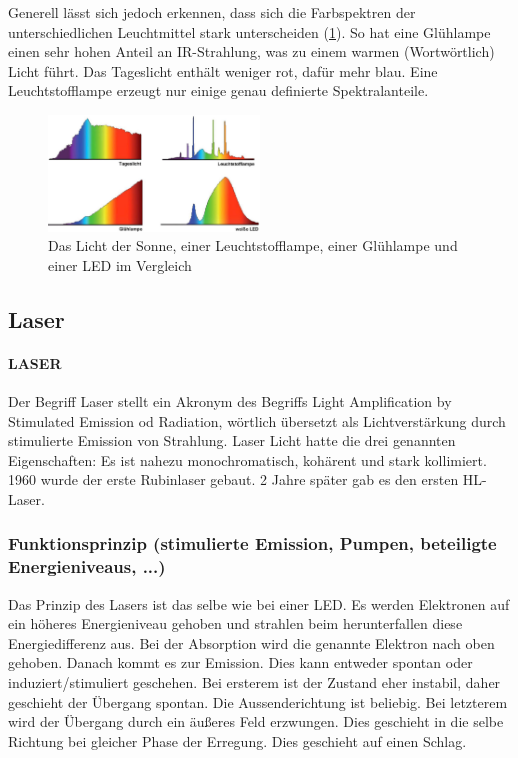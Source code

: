 	Generell lässt sich jedoch erkennen, dass sich die Farbspektren der unterschiedlichen Leuchtmittel stark unterscheiden (\ref{11_spektrum}). So hat eine Glühlampe einen sehr hohen Anteil an IR-Strahlung, was zu einem warmen (Wortwörtlich) Licht führt. Das Tageslicht enthält weniger rot, dafür mehr blau. Eine Leuchtstofflampe erzeugt nur einige genau definierte Spektralanteile. 
	
	\begin{figure}[h]
		\centering
		\includegraphics[width=0.5\textwidth]{Kapitel/Kap11/spektrum.png}
		\caption{Das Licht der Sonne, einer Leuchtstofflampe, einer Glühlampe und einer LED im Vergleich}
		\label{11_spektrum}
	\end{figure}
	
\subsection{Laser}
	\paragraph{LASER} Der Begriff Laser stellt ein Akronym des Begriffs Light Amplification by Stimulated Emission od Radiation, wörtlich übersetzt als Lichtverstärkung durch stimulierte Emission von Strahlung. Laser Licht hatte die drei genannten Eigenschaften: Es ist nahezu monochromatisch, kohärent und stark kollimiert. 1960 wurde der erste Rubinlaser gebaut. 2 Jahre später gab es den ersten HL-Laser.
	\subsubsection{Funktionsprinzip (stimulierte Emission, Pumpen, beteiligte Energieniveaus, ...)}
	Das Prinzip des Lasers ist das selbe wie bei einer LED. Es werden Elektronen auf ein höheres Energieniveau gehoben und strahlen beim herunterfallen diese Energiedifferenz aus. Bei der Absorption wird die genannte Elektron nach oben gehoben. Danach kommt es zur Emission. Dies kann entweder spontan oder induziert/stimuliert geschehen. Bei ersterem ist der Zustand eher instabil, daher geschieht der Übergang spontan. Die Aussenderichtung ist beliebig. Bei letzterem wird der Übergang durch ein äußeres Feld erzwungen. Dies geschieht in die selbe Richtung bei gleicher Phase der Erregung. Dies geschieht auf einen Schlag.
	
